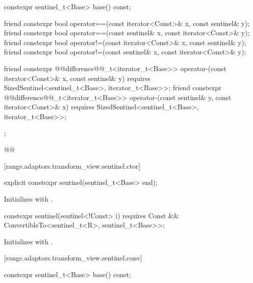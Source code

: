 {\begin{codeblock}
{{    constexpr sentinel_t<Base> base() const;

    friend constexpr bool operator==(const iterator<Const>& x, const sentinel& y);
    friend constexpr bool operator==(const sentinel& x, const iterator<Const>& y);
    friend constexpr bool operator!=(const iterator<Const>& x, const sentinel& y);
    friend constexpr bool operator!=(const sentinel& x, const iterator<Const>& y);

    friend constexpr @@difference@@_t<iterator_t<Base>>
      operator-(const iterator<Const>& x, const sentinel& y)
        requires SizedSentinel<sentinel_t<Base>, iterator_t<Base>>;
    friend constexpr @@difference@@_t<iterator_t<Base>>
      operator-(const sentinel& y, const iterator<Const>& x)
        requires SizedSentinel<sentinel_t<Base>, iterator_t<Base>>;
  };
}@\oldtxt{\}}@
\end{codeblock}

[range.adaptors.transform_view.sentinel.ctor]{}

\begin{itemdecl}
explicit constexpr sentinel(sentinel_t<Base> end);
\end{itemdecl}

\begin{itemdescr}
\pnum
\effects Initializes  with .
\end{itemdescr}

\begin{itemdecl}
constexpr sentinel(sentinel<!Const> i)
  requires Const && ConvertibleTo<sentinel_t<R>, sentinel_t<Base>>;
\end{itemdecl}

\begin{itemdescr}
\pnum
\effects Initializes  with .
\end{itemdescr}

[range.adaptors.transform_view.sentinel.conv]{}

\begin{itemdecl}
constexpr sentinel_t<Base> base() const;
\end{itemdecl}

\begin{itemdescr}
\pnum
\oldtxt{\returns}  
\end{itemdescr}

}
